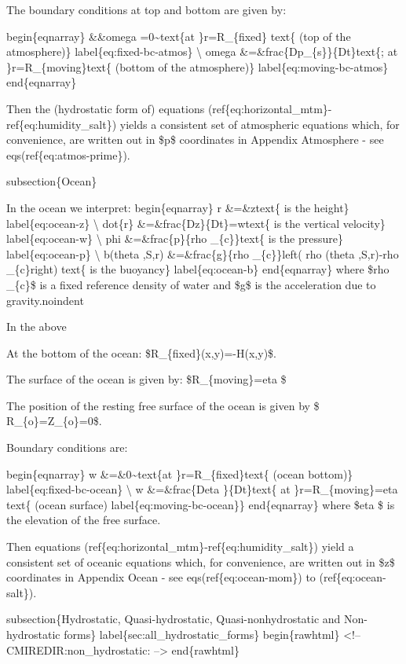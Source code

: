 \documentclass[letterpaper,10pt,english]{sphinxmanual}
\begin{document}
The boundary conditions at top and bottom are given by:

begin\{eqnarray\}
\&\&omega =0\textasciitilde{}text\{at \}r=R\_\{fixed\} text\{ (top of the atmosphere)\}
label\{eq:fixed-bc-atmos\} \textbackslash{}
omega \&=\&frac\{Dp\_\{s\}\}\{Dt\}text\{; at \}r=R\_\{moving\}text\{ (bottom of the
atmosphere)\}  label\{eq:moving-bc-atmos\}
end\{eqnarray\}

Then the (hydrostatic form of) equations
(ref\{eq:horizontal\_mtm\}-ref\{eq:humidity\_salt\}) yields a consistent
set of atmospheric equations which, for convenience, are written out
in \$p\$ coordinates in Appendix Atmosphere - see
eqs(ref\{eq:atmos-prime\}).

subsection\{Ocean\}

In the ocean we interpret:
begin\{eqnarray\}
r \&=\&ztext\{ is the height\}  label\{eq:ocean-z\} \textbackslash{}
dot\{r\} \&=\&frac\{Dz\}\{Dt\}=wtext\{ is the vertical velocity\}
label\{eq:ocean-w\} \textbackslash{}
phi \&=\&frac\{p\}\{rho \_\{c\}\}text\{ is the pressure\}  label\{eq:ocean-p\} \textbackslash{}
b(theta ,S,r) \&=\&frac\{g\}\{rho \_\{c\}\}left( rho (theta ,S,r)-rho
\_\{c\}right) text\{ is the buoyancy\}  label\{eq:ocean-b\}
end\{eqnarray\}
where \$rho \_\{c\}\$ is a fixed reference density of water and \$g\$ is the
acceleration due to gravity.noindent

In the above

At the bottom of the ocean: \$R\_\{fixed\}(x,y)=-H(x,y)\$.

The surface of the ocean is given by: \$R\_\{moving\}=eta \$

The position of the resting free surface of the ocean is given by \$
R\_\{o\}=Z\_\{o\}=0\$.

Boundary conditions are:

begin\{eqnarray\}
w \&=\&0\textasciitilde{}text\{at \}r=R\_\{fixed\}text\{ (ocean bottom)\}  label\{eq:fixed-bc-ocean\}
\textbackslash{}
w \&=\&frac\{Deta \}\{Dt\}text\{ at \}r=R\_\{moving\}=eta text\{ (ocean surface)
label\{eq:moving-bc-ocean\}\}
end\{eqnarray\}
where \$eta \$ is the elevation of the free surface.

Then equations (ref\{eq:horizontal\_mtm\}-ref\{eq:humidity\_salt\}) yield a consistent set
of oceanic equations
which, for convenience, are written out in \$z\$ coordinates in Appendix Ocean
- see eqs(ref\{eq:ocean-mom\}) to (ref\{eq:ocean-salt\}).

subsection\{Hydrostatic, Quasi-hydrostatic, Quasi-nonhydrostatic and
Non-hydrostatic forms\}
label\{sec:all\_hydrostatic\_forms\}
begin\{rawhtml\}
\textless{}!-- CMIREDIR:non\_hydrostatic: --\textgreater{}
end\{rawhtml\}
\end{document}
